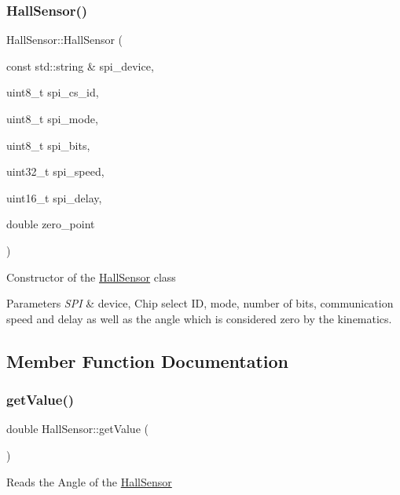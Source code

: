 \subsubsection{\texorpdfstring{Hall\+Sensor()}{HallSensor()}}
{\footnotesize\ttfamily Hall\+Sensor\+::\+Hall\+Sensor (\begin{DoxyParamCaption}\item[{const std\+::string \&}]{spi\+\_\+device,  }\item[{uint8\+\_\+t}]{spi\+\_\+cs\+\_\+id,  }\item[{uint8\+\_\+t}]{spi\+\_\+mode,  }\item[{uint8\+\_\+t}]{spi\+\_\+bits,  }\item[{uint32\+\_\+t}]{spi\+\_\+speed,  }\item[{uint16\+\_\+t}]{spi\+\_\+delay,  }\item[{double}]{zero\+\_\+point }\end{DoxyParamCaption})}

Constructor of the \hyperlink{classHallSensor}{Hall\+Sensor} class 
\begin{DoxyParams}{Parameters}
{\em S\+PI} & device, Chip select ID, mode, number of bits, communication speed and delay as well as the angle which is considered zero by the kinematics. \\
\hline
\end{DoxyParams}


\subsection{Member Function Documentation}
\mbox{\label{classHallSensor_a5eea1969e798bc786c5fa165aeb47c77}} 
\subsubsection{\texorpdfstring{get\+Value()}{getValue()}}
{\footnotesize\ttfamily double Hall\+Sensor\+::get\+Value (\begin{DoxyParamCaption}{ }\end{DoxyParamCaption})}

Reads the Angle of the \hyperlink{classHallSensor}{Hall\+Sensor} \mbox{\label{classHallSensor_ac97079734e670ba56401e6a8b37144e8}} 
